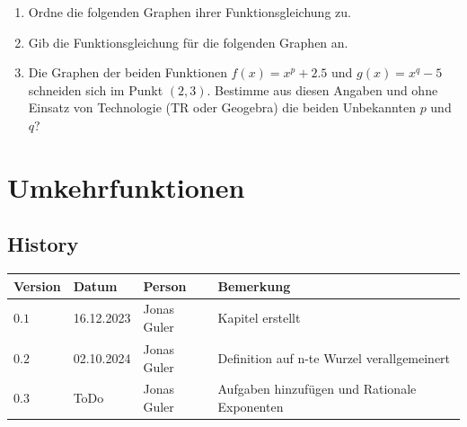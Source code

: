 \documentclass[11pt,oneside]{article}
\begin{document}
	\begin{aufgabe}
		\begin{enumerate}
			\item Ordne die folgenden Graphen ihrer Funktionsgleichung zu.

			\item Gib die Funktionsgleichung für die folgenden Graphen an.

			\item Die Graphen der beiden Funktionen $f(x)=x^p+2.5$ und $g(x)=x^q-5$ schneiden sich im Punkt $(2,3)$. Bestimme aus diesen Angaben und ohne Einsatz von Technologie (TR oder Geogebra) die beiden Unbekannten $p$ und $q$?
		\end{enumerate}
	\end{aufgabe}


\newpage
\section{Umkehrfunktionen}


\newpage
\subsection*{History}
\begin{table}[H]
	\centering
	\begin{tabular}{|p{13mm}|p{20mm}|p{30mm}|p{70mm}|}\hline
		Version & Datum & Person & Bemerkung \\\hline
		$0.1$ & 16.12.2023 & Jonas Guler & Kapitel erstellt \\\hline
		$0.2$ & 02.10.2024 & Jonas Guler & Definition auf n-te Wurzel verallgemeinert \\\hline
		$0.3$ & ToDo & Jonas Guler & Aufgaben hinzufügen und Rationale Exponenten \\\hline
	\end{tabular}
\end{table}
\end{document}

